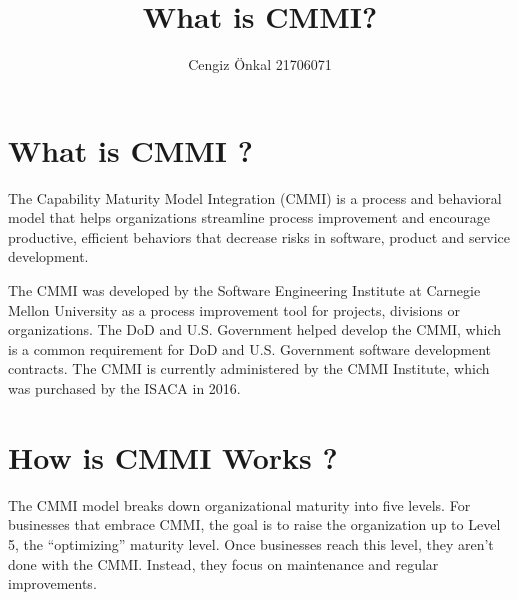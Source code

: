 \documentclass[11pt]{article}
\title{\textbf{What is CMMI?}}
\author{Cengiz Önkal 21706071}
\date{}
\begin{document}
\maketitle

\section{What is CMMI ?}
The Capability Maturity Model Integration (CMMI) is a process and behavioral model that helps organizations streamline process improvement and encourage productive, efficient behaviors that decrease risks in software, product and service development.

The CMMI was developed by the Software Engineering Institute at Carnegie Mellon University as a process improvement tool for projects, divisions or organizations. The DoD and U.S. Government helped develop the CMMI, which is a common requirement for DoD and U.S. Government software development contracts. The CMMI is currently administered by the CMMI Institute, which was purchased by the ISACA in 2016.\cite{cio}

\section{How is CMMI Works ?}
The CMMI model breaks down organizational maturity into five levels. For businesses that embrace CMMI, the goal is to raise the organization up to Level 5, the “optimizing” maturity level. Once businesses reach this level, they aren’t done with the CMMI. Instead, they focus on maintenance and regular improvements.  
\end{document}
